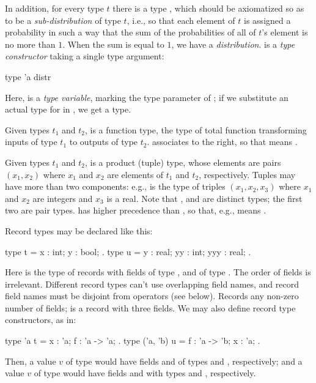 In addition, for every type $t$ there is a type , which
should be axiomatized so as to be a \emph{sub-distribution} of type
$t$, i.e., so that each element of $t$ is assigned a probability in
such a way that the sum of the probabilities of all of $t$'s element
is no more than $1$. When the sum is equal to $1$, we have a
\emph{distribution}.  is a \emph{type constructor} taking a
single type argument:
\begin{easycrypt}{}{}
  type 'a distr
\end{easycrypt}
Here,  is a \emph{type variable}, marking the type parameter of
; if we substitute an actual type for  in ,
we get a type.

Given types $t_1$ and $t_2$,  is a function type,
the type of total function transforming inputs of type $t_1$ to
outputs of type $t_2$. \ec{->} associates to the right, so that
 means .

Given types $t_1$ and $t_2$,  is a product (tuple)
type, whose elements are pairs $(x_1, x_2)$ where $x_1$ and $x_2$ are
elements of $t_1$ and $t_2$, respectively. Tuples may have more than
two components: e.g.,  is the type of triples
$(x_1, x_2, x_3)$ where $x_1$ and $x_2$ are integers and $x_3$ is a real.
Note that ,  and
 are distinct types; the first two are pair types.
\ec{*} has higher precedence than \ec{->}, so that, e.g.,
 means .

Record types may be declared like this:
\begin{easycrypt}{}{}
  type t = { x : int; y : bool; }.
  type u = { y : real; yy : int; yyy : real; }.
\end{easycrypt}
Here  is the type of records with fields  of type
, and  of type . The order of fields is
irrelevant.  Different record types can't use overlapping field names,
and record field names must be disjoint from operators (see
below). Records any non-zero number of fields;  is a record with
three fields. We may also define record type constructors, as in:
\begin{easycrypt}{}{}
  type 'a t = { x : 'a; f : 'a -> 'a; }.
  type ('a, 'b) u = { f : 'a -> 'b; x : 'a; }.
\end{easycrypt}
Then, a value $v$ of type  would have fields  and
 of types  and , respectively; and
a value $v$ of type  would have fields  and
 with types  and , respectively.

